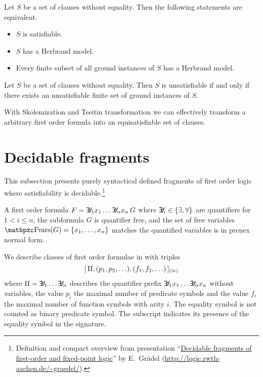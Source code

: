 \begin{theorem}[Herbrand]\label{the:herbrand}
	Let $S$ be a set of clauses without equality. Then the following statements are equivalent.
	\begin{itemize}
		\item $S$ is satisfiable.
		\item $S$ has a Herbrand model.
		\item Every finite subset of all ground instances of $S$ has a Herbrand model.
	\end{itemize} 
\end{theorem}

\begin{corollary}
	Let $S$ be a set of clauses without equality. 
	Then $S$ is unsatisfiable if and only if there exists 
	an unsatisfiable finite set of ground instances of $S$.
\end{corollary}

\begin{lemma}
With Skolemization and Tseitin transformation we can effectively transform a arbitrary first order formula into an equisatisfiable set of clauses.	
\end{lemma}



\section{Decidable fragments}\label{sec:decidable:fol:fragments}

This subsection presents purely syntactical defined fragments
of first order logic where satisfiability is decidable.\footnote{
	Definition and compact overview from presentation
	“\href{http://logic.rwth-aachen.de/~graedel/kalmar.pdf}{Decidable fragments of first-order and fixed-point logic}”
	by E.~Grädel (\url{http://logic.rwth-aachen.de/~graedel/}).	
}  



\begin{definition}[\PNF]
	A first order formula $F = \quantify_1 x_1 \ldots \quantify_n x_n\, G$ 
	where $\quantify_i \in \{\exists,\forall\}$ are quantifiers
	for $1 < i \leq n$,
	the subformula $G$ is quantifier free, and 
	the set of free variables $\fvar(G) = \{ x_1, \ldots, x_n \}$
	matches the quantified variables
	is in {\myem prenex normal form}.
\end{definition}


\begin{definition}[\cite{MR1482227}]\label{def:prefix:class}
	We describe classes of first order formulae in \PNF with triples
	\[
	[\, \Pi, (p_1,p_2,\ldots), (f_1,f_2,\ldots)\,]_{(\approx)}
	\]
	where $\Pi = \quantify_1 \ldots \quantify_n$ describes the quantifier prefix 
	$\quantify_1 x_1 \ldots \quantify_n x_n$ without variables,
	the value $p_i$ the maximal number of predicate symbols
	and the value $f_i$ the maximal number of function symbols with arity $i$.
	The equality symbol is not counted as binary predicate symbol.
	The subscript indicates its presence of the equality symbol in the signature. 
	
\end{definition}

